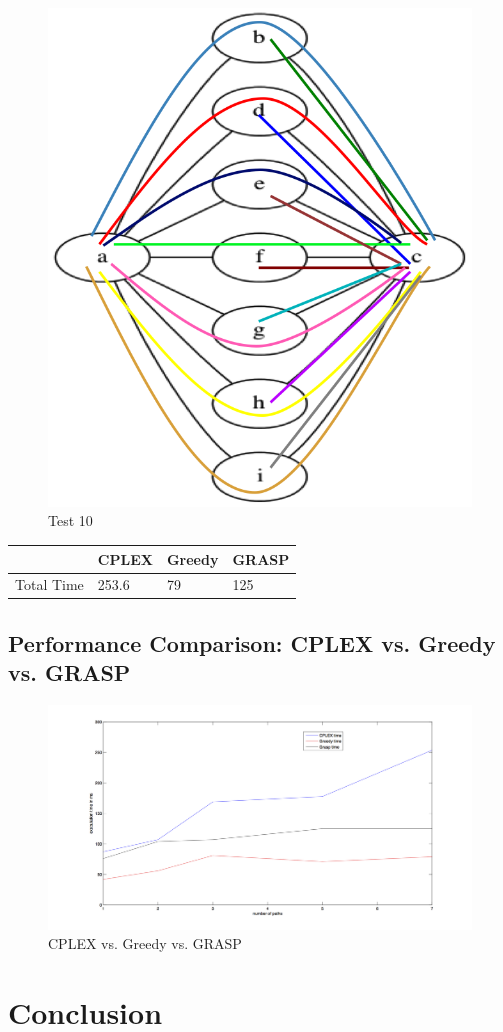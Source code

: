 \documentclass[11pt,a4paper]{article}
\begin{document}
\begin{figure}[H]
  \centering
    \includegraphics[scale=0.7]{inputTest7Hard.png}
  \caption{Test 10}
  \label{fig:test10}
\end{figure}

\begin{tabular}{| l | l | l | l |}
\hline
 & CPLEX & Greedy & GRASP \\ \hline
Total Time & 253.6 & 79 & 125 \\ \hline
\end{tabular}

\subsection{Performance Comparison: CPLEX vs. Greedy vs. GRASP}

\begin{figure}[H]
    \hspace*{-3cm}
	\includegraphics[scale=0.5]{executionTimeGraph.png}
  \caption{CPLEX vs. Greedy vs. GRASP}
  \label{fig:performance}
\end{figure}

\section{Conclusion}
\end{document}
